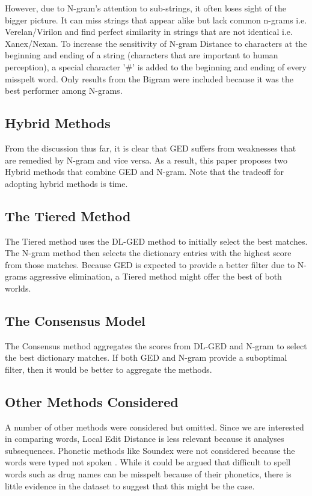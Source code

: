 \documentclass[11pt]{article}
\begin{document}
However, due to N-gram's attention to sub-strings, it often loses sight of the bigger picture. It can miss strings that appear alike but lack common n-grams i.e. Verelan/Virilon and find perfect similarity in strings that are not identical i.e. Xanex/Nexan. To increase the sensitivity of N-gram Distance to characters at the beginning and ending of a string (characters that are important to human perception), a special character '\#' is added to the beginning and ending of every misspelt word.  Only results from the Bigram were included because it was the best performer among N-grams.

\subsection{Hybrid Methods}
From the discussion thus far, it is clear that GED suffers from weaknesses that are remedied by N-gram and vice versa. As a result, this paper proposes two Hybrid methods that combine GED and N-gram. Note that the tradeoff for adopting hybrid methods is time.
 
\subsection{The Tiered Method}
The Tiered method uses the DL-GED method to initially select the best matches. The N-gram method then selects the dictionary entries with the highest score from those matches. Because GED is expected to provide a better filter due to N-grams aggressive elimination, a Tiered method might offer the best of both worlds.
\subsection{The Consensus Model}
The Consensus method aggregates the scores from DL-GED and N-gram to select the best dictionary matches. If both GED and N-gram provide a suboptimal filter, then it would be better to aggregate the methods.

\subsection{Other Methods Considered}
A number of other methods were considered but omitted. Since we are interested in comparing words, Local Edit Distance is less relevant because it analyses subsequences. Phonetic methods like Soundex were not considered because the words were typed not spoken \cite{zobel1996phonetic}. While it could be argued that difficult to spell words such as drug names can be misspelt because of their phonetics, there is little evidence in the dataset to suggest that this might be the case.
 
\end{document}
